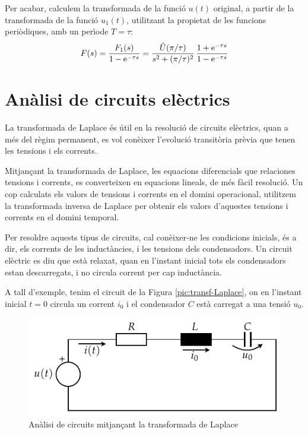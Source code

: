 \begin{exemple}
Per acabar, calculem la transformada de la funci\'{o} $u(t)$ original, a
partir de la transformada de la funci\'{o} $u_1(t)$, utilitzant la
propietat de les funcions peri\`{o}diques, amb un per\'{\i}ode $T=\tau$:
\[
    F(s) = \frac{F_1(s)}{1-\mathrm{e}^{-\tau s}} =
    \frac{\hat{U} (\pi/\tau) }{s^2 + (\pi/\tau)^2}\,\frac{1+\mathrm{e}^{-\tau s}}{1-\mathrm{e}^{-\tau
    s}}
\]

\end{exemple}

\section{An\`{a}lisi de circuits el\`{e}ctrics}

La transformada de Laplace \'{e}s \'{u}til en la resoluci\'{o} de circuits
el\`{e}ctrics, quan a m\'{e}s del r\`{e}gim permanent, es vol con\`{e}ixer
l'evoluci\'{o} transit\`{o}ria pr\`{e}via que tenen les tensions i els corrents.

Mitjan\c{c}ant la transformada de Laplace, les equacions diferencials
que relaciones tensions i corrents, es converteixen en equacions
lineals, de m\'{e}s f\`{a}cil resoluci\'{o}. Un cop calculats els valors de
tensions i corrents en el domini operacional, utilitzem la
transformada inversa de Laplace per obtenir els valors d'aquestes
tensions i corrents en el domini temporal.

Per resoldre aquests tipus de circuits, cal con\`{e}ixer-ne les
condicions inicials, \'{e}s a dir, els corrents de les induct\`{a}ncies, i
les tensions dels condensadors. Un circuit el\`{e}ctric es diu que est\`{a}
relaxat, quan en l'instant inicial tots els condensadors estan
descarregats, i no circula corrent per cap induct\`{a}ncia.

A tall d'exemple, tenim el circuit de la Figura
\vref{pic:transf-Laplace}, on en l'instant inicial $t=0$ circula un
corrent $i_0$ i el condensador $C$ est\`{a} carregat a una tensi\'{o} $u_0$.
\begin{figure}[h]
\centering
    \includegraphics{Imatges/Cap-Laplace-Circuit-RLC.pdf}
\caption{An\`{a}lisi de circuits mitjan\c{c}ant la transformada de Laplace}
\label{pic:transf-Laplace}
\end{figure}

